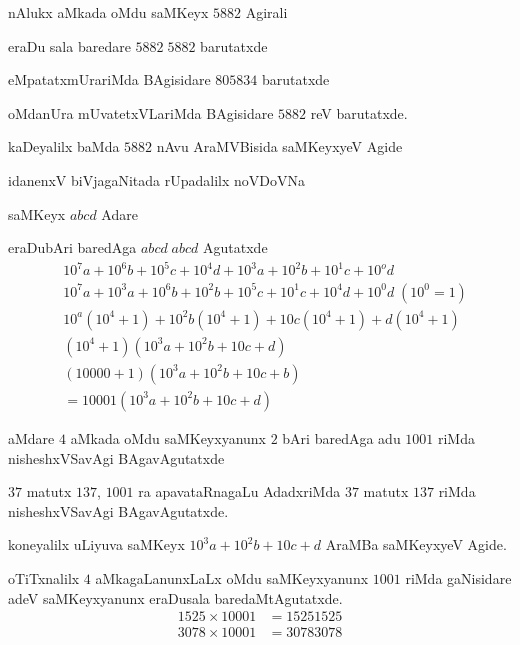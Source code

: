 nAlukx aMkada oMdu saMKeyx $5882$ Agirali

eraDu sala baredare $5882\; 5882$ barutatxde

eMpatatxmUrariMda BAgisidare $805834$ barutatxde

oMdanUra mUvatetxVLariMda BAgisidare $5882$ reV barutatxde.

kaDeyalilx baMda $5882$ nAvu AraMVBisida saMKeyxyeV Agide

idanenxV biVjagaNitada rUpadalilx noVDoVNa

saMKeyx $abcd$ Adare

eraDubAri baredAga $abcd\;abcd$ Agutatxde
\begin{align*}
& 10^{7}a + 10^{6}b +10^{5}c +10^{4}d + 10^{3}a + 10^{2}b +10^{1}c +10^{o}d\\
& 10^{7}a +10^{3}a +10^{6}b +10^{2}b + 10^{5}c +10^{1}c + 10^{4}d +10^{0}d \;\text{$\left(10^0 =1\right)$}\\
& 10^a\left(10^4 +1\right) +10^{2}b\left(10^4 +1\right) + 10c\left(10^4 +1\right) +d \left(10^4+ 1\right)\\
&\left(10^4 +1\right) \left(10^{3}a + 10^{2}b +10c + d\right)\\
&(10000+1)\left(10^{3}a + 10^{2}b+10c+b\right)\\
&=10001\left(10^{3}a + 10^{2}b +10c +d\right)
 \end{align*}
 
aMdare $4$ aMkada oMdu saMKeyxyanunx $2$ bAri baredAga adu $1001$ riMda nisheshxVSavAgi BAgavAgutatxde

$37$ matutx $137$, $1001$ ra apavataRnagaLu AdadxriMda $37$ matutx $137$ riMda nisheshxVSavAgi BAgavAgutatxde.

koneyalilx uLiyuva saMKeyx $10^{3}a+10^{2}b+10c+d$ AraMBa saMKeyxyeV Agide.

\vfill\eject
oTiTxnalilx $4$ aMkagaLanunxLaLx oMdu saMKeyxyanunx $1001$ riMda gaNisidare adeV saMKeyx\-yanunx eraDusala baredaMtAgutatxde. 
\begin{align*}
1525\times 10001 &= 15251525\\
3078 \times 10001 &= 30783078
\end{align*}
